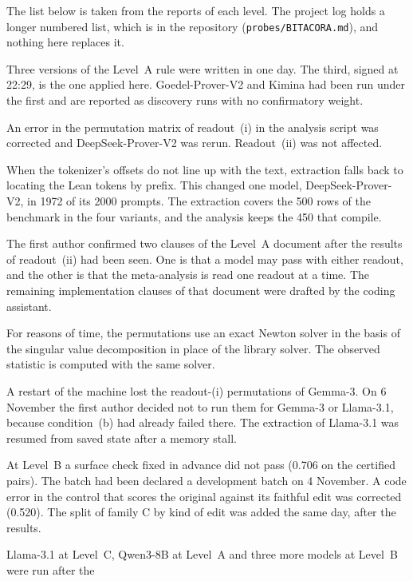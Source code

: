 \documentclass[10pt]{article}
\newcommand{\vr}[1]{\texttt{#1}}
\begin{document}
The list below is taken from the reports of each level. The project log holds a longer numbered list, which is in the repository (\vr{probes/BITACORA.md}), and nothing here replaces it.

\begin{description}[leftmargin=1.2em]
\item[4 Nov] Three versions of the Level~A rule were written in one day. The third, signed at 22:29, is the one
applied here. Goedel-Prover-V2 and Kimina had been run under the first and are reported as discovery runs with no confirmatory weight.
\item[5 Nov, 08:37] An error in the permutation matrix of readout~(i) in the analysis script was corrected and
DeepSeek-Prover-V2 was rerun. Readout~(ii) was not affected.
\item[5 Nov] When the tokenizer's offsets do not line up with the text, extraction falls back to locating the Lean
tokens by prefix. This changed one model, DeepSeek-Prover-V2, in 1972 of its 2000 prompts.
The extraction covers the 500 rows of the benchmark in the four variants, and the analysis keeps the 450 that
compile.
\item[5 Nov] The first author confirmed two clauses of the Level~A document after the results of readout~(ii) had
been seen. One is that a model may pass with either readout, and the other is that the meta-analysis is read one
readout at a time. The remaining implementation clauses of that document were drafted by the coding assistant.
\item[5 Nov] For reasons of time, the permutations use an exact Newton solver in the basis of the singular value
decomposition in place of the library solver. The observed statistic is computed with the same solver.
\item[5--6 Nov] A restart of the machine lost the readout-(i) permutations of Gemma-3. On 6 November the first
author decided not to run them for Gemma-3 or Llama-3.1, because condition~(b) had already failed there. The
extraction of Llama-3.1 was resumed from saved state after a memory stall.
\item[6 Nov] At Level~B a surface check fixed in advance did not pass (0.706 on the certified pairs). The batch had been declared a development batch on 4 November. A code error in the control that scores the original against its faithful edit was
corrected (0.520). The split of family C by kind of edit was added the same day, after the results.
\item[7--8 Nov] Llama-3.1 at Level~C, Qwen3-8B at Level~A and three more models at Level~B were run after the

\end{description}
\end{document}
